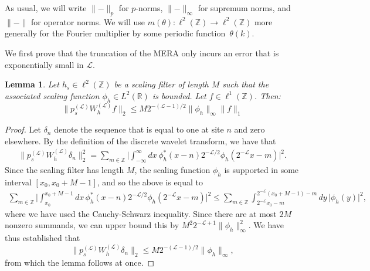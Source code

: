 \documentclass[aps,pra,reprint,superscriptaddress,floatfix,amsmath,amssymb,amsfonts]{revtex4-1}
\newtheorem{lem}{Lemma}\crefname{lem}{Lemma}{Lemmas}
\newcommand*{\Z}{\mathbb Z}
\newcommand*{\R}{\mathbb R}
\begin{document}
As usual, we will write $\lVert-\rVert_p$ for $p$-norms, $\lVert-\rVert_\infty$ for supremum norms, and $\lVert-\rVert$ for operator norms.
We will use $m(\theta)\colon\ell^2(\Z)\to\ell^2(\Z)$ more generally for the Fourier multiplier by some periodic function~$\theta(k)$.

We first prove that the truncation of the MERA only incurs an error that is exponentially small in $\mathcal L$.

\begin{lem}\label{lem:scaling decay}
Let $h_s\in\ell^2(\Z)$ be a scaling filter of length $M$ such that the associated scaling function $\phi_h \in L^2(\R)$ is bounded.
Let $f \in \ell^1(\Z)$.
Then:
\[ \lVert p_s^{(\mathcal L)} W_h^{(\mathcal L)} f \rVert_2 \leq M 2^{-(\mathcal L-1)/2} \lVert \phi_h\rVert_\infty \lVert f\rVert_1 \]
\end{lem}
\begin{proof}
Let $\delta_n$ denote the sequence that is equal to one at site $n$ and zero elsewhere.
By the definition of the discrete wavelet transform, we have that
\begin{align*}
\lVert p_s^{(\mathcal L)} W_h^{(\mathcal L)} \delta_n \rVert_2^2 = \sum_{m\in\Z} \bigl\lvert\int_{-\infty}^\infty dx \, \phi_h^*(x-n) 2^{-\mathcal L/2} \phi_h(2^{-\mathcal L}x-m)\bigr\rvert^2.
\end{align*}
Since the scaling filter has length $M$, the scaling function $\phi_h$ is supported in some interval $[x_0,x_0+M-1]$, and so the above is equal to
\begin{align*}
\sum_{m\in\Z} \bigl\lvert \int_{x_0}^{x_0+M-1} dx \, \phi^*_h(x-n) 2^{-\mathcal L/2} \phi_h(2^{-\mathcal L}x-m) \bigr\rvert^2
\leq \sum_{m\in\Z} \int_{2^{-\mathcal L}x_0-m}^{2^{-\mathcal L}(x_0+M-1)-m} dy \, \lvert \phi_h(y) \rvert^2,
\end{align*}
where we have used the Cauchy-Schwarz inequality.
Since there are at most $2M$ nonzero summands, we can upper bound this by
$M^2 2^{-\mathcal L+1} \lVert \phi_h\rVert_\infty^2$.
We have thus established that
\[ \lVert p_s^{(\mathcal L)} W_h^{(\mathcal L)} \delta_n \rVert_2 \leq M 2^{-(\mathcal L-1)/2} \lVert \phi_h\rVert_\infty, \]
from which the lemma follows at once.
\end{proof}
\end{document}
